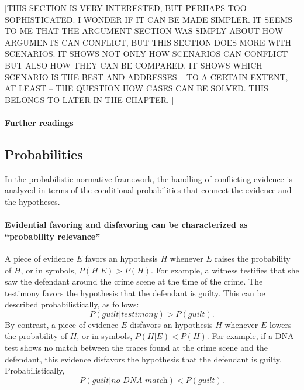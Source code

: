 \documentclass[10pt]{article}
\begin{document}
[THIS SECTION IS VERY INTERESTED, BUT PERHAPS TOO SOPHISTICATED. 
I WONDER IF IT CAN BE MADE SIMPLER. IT SEEMS TO ME THAT THE ARGUMENT SECTION WAS SIMPLY ABOUT HOW ARGUMENTS CAN CONFLICT, 
BUT THIS SECTION DOES MORE WITH SCENARIOS. IT SHOWS NOT ONLY HOW SCENARIOS CAN CONFLICT BUT ALSO HOW THEY CAN BE COMPARED. 
IT  SHOWS WHICH SCENARIO IS THE BEST AND ADDRESSES -- TO A CERTAIN EXTENT, AT LEAST -- THE QUESTION HOW CASES CAN BE SOLVED. 
THIS BELONGS TO LATER IN THE CHAPTER. ]


\paragraph{Further readings} 

\cite{bennettFeldman1981,penningtonHastie1993,penningtonHastie1993StoryModel,wagenaarEtal1993}

\subsection{Probabilities}

In the probabilistic normative framework, the handling of conflicting evidence is analyzed in terms of the conditional probabilities that connect the evidence and the hypotheses.

\paragraph{Evidential favoring and disfavoring can be characterized as ``probability relevance''} 
A piece of evidence $E$ favors an 
hypothesis $H$ whenever $E$ raises the probability of $H$, or in symbols, 
$P(H|E) > P(H)$. 
For example, a witness 
testifies that she saw the defendant around the crime scene
 at the time of the crime. The testimony favors the hypothesis 
 that the defendant is guilty. 
This can be described probabilistically, as follows:
 \[ P(\textit{guilt}|\textit{testimony}) > P(\textit{guilt}).\] 
By contrast, a piece of evidence $E$ disfavors an hypothesis $H$ whenever $E$ lowers 
the probability of $H$, or in symbols, $P(H|E) < P(H)$.
For example, if a DNA test shows no match between the traces found at the crime
 scene and the defendant, this evidence disfavors the hypothesis that the defendant is guilty. 
 Probabilistically, 
%
\[ P(\textit{guilt}|\textit{no DNA match}) < P(\textit{guilt}).\]  
%
 
\end{document}
